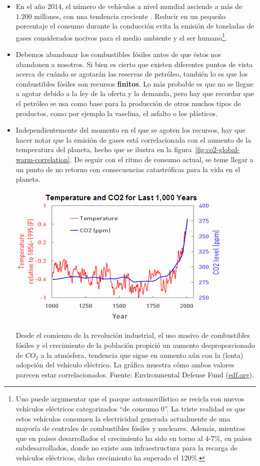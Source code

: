 \begin{itemize}
	\item En el año 2014, el número de vehículos a nivel mundial asciende a más de $1.200$ millones, con una tendencia creciente \cite{oica2014motrate}. Reducir en un pequeño porcentaje el consumo durante la conducción evita la emisión de toneladas de gases considerados nocivos para el medio ambiente y el ser humano\footnote{Uno puede argumentar que el parque automovilístico se recicla con nuevos vehículos eléctricos categorizados \enquote{de consumo 0}. La triste realidad es que estos vehículos consumen la electricidad generada actualmente de una mayoría de centrales de combustibles fósiles y nucleares. Además, mientras que en países desarrollados el crecimiento ha sido en torno al 4-7\%, en países subdesarrollados, donde no existe aun infraestructura para la recarga de vehículos eléctricos, dicho crecimiento ha superado el 120\%.}.
	\item Debemos abandonar los combustibles fósiles antes de que éstos nos abandonen a nosotros. Si bien es cierto que existen diferentes puntos de vista acerca de cuándo se agotarán las reservas de petróleo, también lo es que los combustibles fósiles son recursos \textbf{finitos}. Lo más probable es que no se llegue a agotar debido a la ley de la oferta y la demanda, pero hay que recordar que el petróleo se usa como base para la producción de otros muchos tipos de productos, como por ejemplo la vaselina, el asfalto o los plásticos.
	\item Independientemente del momento en el que se agoten los recursos, hay que hacer notar que la emisión de gases está correlacionada con el aumento de la temperatura del planeta, hecho que se ilustra en la figura~\ref{fig:co2-global-warm-correlation}. De seguir con el ritmo de consumo actual, se teme llegar a un punto de no retorno con consecuencias catastróficas para la vida en el planeta.

\begin{marginfigure}
	\centering
	\includegraphics{images/co2-global-warm-correlation}
	\caption{Desde el comienzo de la revolución industrial, el uso masivo de combustibles fósiles y el crecimiento de la población propició un aumento desproporcionado de $CO_2$ a la atmósfera, tendencia que sigue en aumento aún con la (lenta) adopción del vehículo eléctrico. La gráfica muestra cómo ambos valores parecen estar correlacionados. Fuente: Environmental Defense Fund (\url{edf.org}).}
	\label{fig:co2-global-warm-correlation}
\end{marginfigure}


\end{itemize}
